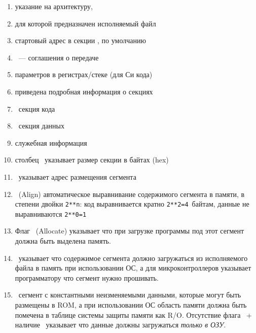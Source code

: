 
\begin{enumerate}
\item указание на архитектуру, 

\item для которой предназначен исполняемый файл

\item стартовый адрес в секции , по умолчанию

\item {}\ --- соглашения о передаче 

\item параметров в регистрах/стеке (для Си кода) 

\item приведена подробная информация о секциях

\item {}\ секция кода

\item {}\ секция данных

\item служебная информация

\item столбец \ указывает размер секции в байтах (hex)

\item {}\ указывает адрес размещения
сегмента

\item {}\ (Align) автоматическое выравнивание содержимого сегмента в
памяти, в степени двойки \verb|2**n|: код выравнивается кратно \verb|2**2=4|\
байтам, данные не выравниваются \verb|2**0=1| 

\item Флаг \ (Allocate) указывает что при загрузке программы под этот 
сегмент должна быть выделена память.

\item {}\ указывает что содержимое сегмента должно загружаться из
исполняемого файла в память при использовании ОС, а для микроконтроллеров
указывает программатору что сегмент нужно прошивать.

\item {}\ сегмент с константными неизменяемыми данными, которые
могут быть размещены в ROM, а при использовании ОС область памяти должна быть
помечена в таблице системы защиты памяти как R/O. Отсутствие флага
\var{READONLY}\ + наличие \var{LOAD}\ указывает что данные должны загружаться
\emph{только в ОЗУ}.


\end{enumerate}
